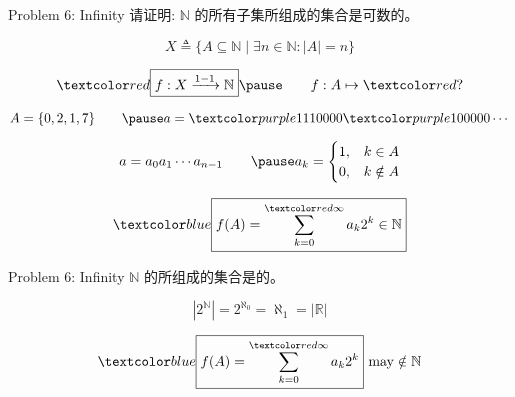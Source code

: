 
\begin{frame}{}
  \begin{exampleblock}{Problem 6: Infinity}
    请证明: $\mathbb{N}$ 的所有子集所组成的集合是可数的。
  \end{exampleblock}

  \pause
  \[
    X \triangleq \Big\{A \subseteq \mathbb{N} \mid \exists n \in \mathbb{N}: |A| = n\Big\}
  \]

  \pause
  \[
    \red{\boxed{f: X \xrightarrow{1-1} \mathbb{N}}}
    \pause \qquad f: A \mapsto \red{?}
  \]

  \pause
  \vspace{-0.30cm}
  \[
    A = \set{0, 2, 1, 7} \qquad \pause a = \purple{111}0000\purple{1}00000\cdots
  \]

  \pause
  \vspace{-0.30cm}
  \[
    a = a_0 a_1 \cdots a_{n-1} \qquad \pause
    a_{k} = \begin{cases}
      1, & k \in A \\
      0, & k \notin A
    \end{cases}
  \]

  \pause
  \vspace{-0.30cm}
  \[
    \blue{\boxed{f(A) = \sum_{k=0}^{\red{\infty}} a_{k} 2^{k} \in \mathbb{N}}}
  \]
\end{frame}

\begin{frame}{}
  \begin{exampleblock}{Problem 6: Infinity}
    $\mathbb{N}$ 的所组成的集合是的。
  \end{exampleblock}

  \pause
  \[
    |2^{\mathbb{N}}| = 2^{\aleph_{0}} = \aleph_{1} = |\mathbb{R}|
  \]
  
  \pause
  \vspace{0.80cm}
  \[
    \blue{\boxed{f(A) = \sum_{k=0}^{\red{\infty}} a_{k} 2^{k}}} \text{ may} \notin \mathbb{N}
  \]
\end{frame}
